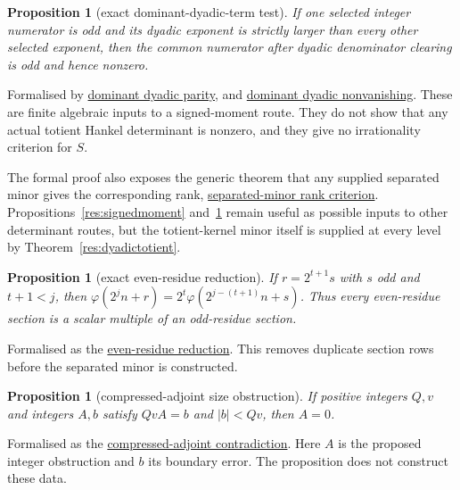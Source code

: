 \documentclass[11pt]{article}
\newcommand{\commit}{99f4bf47422abbd8757cbb22b50ba079d764d3a7}
\newcommand{\repobase}{https://github.com/wcook04/plectis-erdos/blob/\commit}
\newcommand{\PK}{Erdos249257}
\newcommand{\lword}[4]{\href{\repobase/\PK/#1\#L#2}{#4}}
\newtheorem{proposition}[theorem]{Proposition}
\theoremstyle{definition}
\theoremstyle{remark}
\newcommand{\ph}{\varphi}
\begin{document}
{\begin{proposition}[exact dominant-dyadic-term test]\label{res:dominantdyadic}
If one selected integer numerator is odd and its dyadic exponent is strictly
larger than every other selected exponent, then the common numerator after
dyadic denominator clearing is odd and hence nonzero.
\end{proposition}
\noindent Formalised by
\lword{SignedQMomentObstruction.lean}{78}{scaled_dyadic_sum_odd}{dominant dyadic parity}, and
\lword{SignedQMomentObstruction.lean}{96}{scaled_dyadic_sum_ne_zero}{dominant dyadic nonvanishing}.
These are finite algebraic inputs to a signed-moment route.  They do not show
that any actual totient Hankel determinant is nonzero, and they give no
irrationality criterion for $S$.

The formal proof also exposes the generic theorem that any supplied separated
minor gives the corresponding rank,
\lword{TotientMahlerDefect.lean}{111}{finrank_canonicalTotientKernel_eq_of_certificate}{separated-minor rank criterion}.
Propositions~\ref{res:signedmoment} and~\ref{res:dominantdyadic} remain useful
as possible inputs to other determinant routes, but the totient-kernel minor
itself is supplied at every level by Theorem~\ref{res:dyadictotient}.

\begin{proposition}[exact even-residue reduction]\label{res:evenresidue}
If $r=2^{t+1}s$ with $s$ odd and $t+1<j$, then
$\ph(2^jn+r)=2^t\ph(2^{j-(t+1)}n+s)$.  Thus every even-residue section is a
scalar multiple of an odd-residue section.
\end{proposition}
\noindent Formalised as the
\lword{TotientMahlerDefect.lean}{169}{totientKernel_even_residue_reduce}{even-residue reduction}.
This removes duplicate section rows before the separated minor is constructed.

\begin{proposition}[compressed-adjoint size obstruction]\label{res:compressedadjoint}
If positive integers $Q,v$ and integers $A,b$ satisfy $QvA=b$ and
$|b|<Qv$, then $A=0$.
\end{proposition}
\noindent Formalised as the
\lword{TotientMahlerDefect.lean}{1183}{false_of_compressedAdjointCertificate}{compressed-adjoint contradiction}.
Here $A$ is the proposed integer obstruction and $b$ its boundary error.  The
proposition does not construct these data.

}
\end{document}
